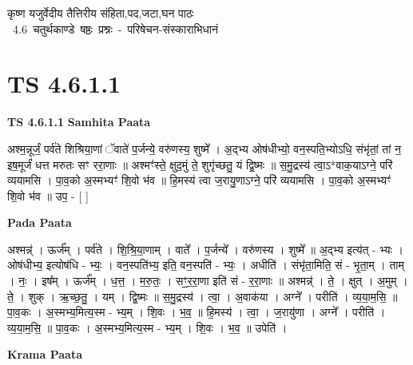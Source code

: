 \documentclass[17pt]{extarticle}
\begin{document}
\begin{titlepage}
    \begin{center}
 
\begin{sanskrit}
    { \Large
    कृष्ण यजुर्वेदीय तैत्तिरीय संहिता,पद,जटा,घन पाठः 
    }
    \\
    \vspace{2.5cm}
    \mbox{ \Large
    4.6      चतुर्थकाण्डे षष्ठः प्रश्नः - परिषेचन-संस्काराभिधानं   }
\end{sanskrit}
\end{center}

\end{titlepage}
\tableofcontents
{}
\pagebreak


\section{ TS 4.6.1.1 }

\textbf{TS 4.6.1.1 } \newline
\textbf{Samhita Paata} \newline

अश्म॒न्नूर्जं॒ पर्व॑ते शिश्रिया॒णां ॅवाते॑ प॒र्जन्ये॒ वरु॑णस्य॒ शुष्मे᳚ । अ॒द्भ्य ओष॑धीभ्यो॒ वन॒स्पति॒भ्योऽधि॒ संभृ॑तां॒ तां न॒ इष॒मूर्जं॑ धत्त मरुतः सꣳ ररा॒णाः ॥ अश्मꣳ॑स्ते॒ क्षुद॒मुं ते॒ शुगृ॑च्छतु॒ यं द्वि॒ष्मः ॥ स॒मु॒द्रस्य॑ त्वा॒ऽ*वाक॒याऽग्ने॒ परि॑ व्ययामसि । पा॒व॒को अ॒स्मभ्यꣳ॑ शि॒वो भ॑व ॥ हि॒मस्य॑ त्वा ज॒रायु॒णाऽग्ने॒ परि॑ व्ययामसि । पा॒व॒को अ॒स्मभ्यꣳ॑ शि॒वो भ॑व ॥ उप॒ - [  ] \newline

\textbf{Pada Paata} \newline

अश्मन्न्॑ । ऊर्ज᳚म् । पर्व॑ते । शि॒श्रि॒या॒णाम् । वाते᳚ । प॒र्जन्ये᳚ । वरु॑णस्य । शुष्मे᳚ ॥ अ॒द्भ्य इत्य॑त् - भ्यः । ओष॑धीभ्य॒ इत्योष॑धि - भ्यः॒ । वन॒स्पति॑भ्य॒ इति॒ वन॒स्पति॑ - भ्यः॒ । अधीति॑ । संभृ॑ता॒मिति॒ सं - भृ॒ता॒म् । ताम् । नः॒ । इष᳚म् । ऊर्ज᳚म् । ध॒त्त॒ । म॒रु॒तः॒ । सꣳ॒॒र॒रा॒णा इति॑ सं - र॒रा॒णाः ॥ अश्मन्न्॑ । ते॒ । क्षुत् । अ॒मुम् । ते॒ । शुक् । ऋ॒च्छ॒तु॒ । यम् । द्वि॒ष्मः ॥ स॒मु॒द्रस्य॑ । त्वा॒ । अ॒वाक॑या । अग्ने᳚ । परीति॑ । व्य॒या॒म॒सि॒ ॥ पा॒व॒कः । अ॒स्मभ्य॒मित्य॒स्म - भ्य॒म् । शि॒वः । भ॒व॒ ॥ हि॒मस्य॑ । त्वा॒ । ज॒रायु॑णा । अग्ने᳚ । परीति॑ । व्य॒या॒म॒सि॒ ॥ पा॒व॒कः । अ॒स्मभ्य॒मित्य॒स्म - भ्य॒म् । शि॒वः । भ॒व॒ ॥ उपेति॑ ।  \newline


\textbf{Krama Paata} \newline
\end{document}

